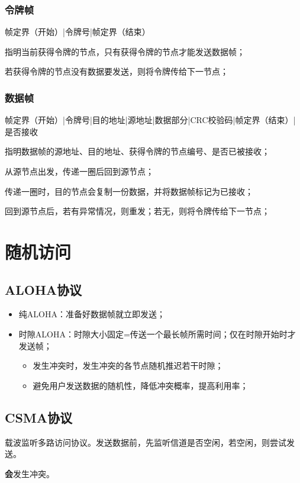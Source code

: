 \subsubsection{令牌帧}
帧定界（开始）|令牌号|帧定界（结束）

指明当前获得令牌的节点，只有获得令牌的节点才能发送数据帧；

若获得令牌的节点没有数据要发送，则将令牌传给下一节点；


\subsubsection{数据帧}
帧定界（开始）|令牌号|目的地址|源地址|数据部分|CRC校验码|帧定界（结束）|是否接收

指明数据帧的源地址、目的地址、获得令牌的节点编号、是否已被接收；

从源节点出发，传递一圈后回到源节点；

传递一圈时，目的节点会复制一份数据，并将数据帧标记为已接收；

回到源节点后，若有异常情况，则重发；若无，则将令牌传给下一节点；


\section{随机访问}\label{随机访问}

\subsection{ALOHA协议}
\begin{itemize}
    \item 纯ALOHA：准备好数据帧就立即发送；
    \item 时隙ALOHA：时隙大小固定=传送一个最长帧所需时间；仅在时隙开始时才发送帧；\begin{itemize}
        \item 发生冲突时，发生冲突的各节点随机推迟若干时隙；
        \item 避免用户发送数据的随机性，降低冲突概率，提高利用率；
    \end{itemize}
\end{itemize}


\subsection{CSMA协议}
载波监听多路访问协议。发送数据前，先监听信道是否空闲，若空闲，则尝试发送。

\textbf{会}发生冲突。

